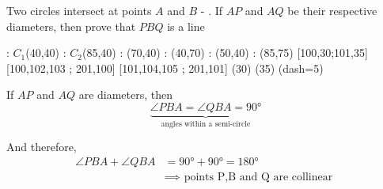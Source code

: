 

\question[2] Two circles intersect at points $A$ and $B$ - \asif. If $AP$ and $AQ$ be their 
respective diameters, then prove that $PBQ$ is a line

  : $C_1$(40,40)
  : $C_2$(85,40)
  : (70,40) %
  : (40,70) %
  : (50,40) %
  : (85,75)
   [100,30;101,35] %
   [100,102,103 ; 201,100] %
   [101,104,105 ; 201,101] %
\figdrawbegin{}
  (30)
  (35)
  \figdrawline [201,301]
  \figdrawline [201,311]
  \figdrawline [301,311]
  \ifprintanswers
    \figset (dash=5)
    \figdrawline [201,200]
  \fi
\figdrawend
{}

\ifprintanswers
  \begin{marginfigure}
    \centerline{\box\figBoxA}
  \end{marginfigure}
\else
  \vspace{1cm}
  \centerline{\box\figBoxA}
\fi

\begin{solution}[\halfpage]
	If $AP$ and $AQ$ are diameters, then 
  \[ \underbrace{\angle{PBA}=\angle{QBA}=\ang{90}}_{\text{angles within a semi-circle}} \]
	
	And therefore, 
	\begin{align}
		\angle PBA + \angle QBA &= \ang{90} + \ang{90} = \ang{180} \\
		     &\implies \text{ points P,B and Q are collinear }
	\end{align}
\end{solution}

